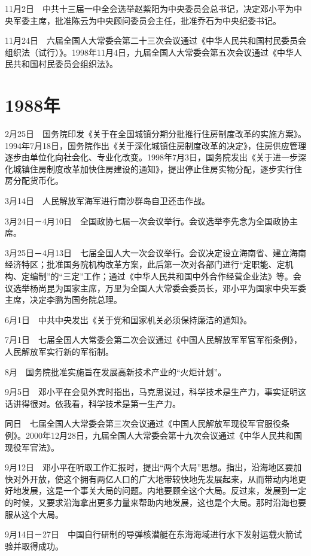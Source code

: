 \documentclass[10pt,a4paper,twocolumn]{book}
\begin{document}
11月2日　中共十三届一中全会选举赵紫阳为中央委员会总书记，决定邓小平为中央军委主席，批准陈云为中央顾问委员会主任，批准乔石为中央纪委书记。

11月24日　六届全国人大常委会第二十三次会议通过《中华人民共和国村民委员会组织法（试行）》。1998年11月4日，九届全国人大常委会第五次会议通过《中华人民共和国村民委员会组织法》。

\section{1988年}

2月25日　国务院印发《关于在全国城镇分期分批推行住房制度改革的实施方案》。1994年7月18日，国务院作出《关于深化城镇住房制度改革的决定》，住房供应管理逐步由单位化向社会化、专业化改变。1998年7月3日，国务院发出《关于进一步深化城镇住房制度改革加快住房建设的通知》，提出停止住房实物分配，逐步实行住房分配货币化。

3月14日　人民解放军海军进行南沙群岛自卫还击作战。

3月24日－4月10日　全国政协七届一次会议举行。会议选举李先念为全国政协主席。

3月25日－4月13日　七届全国人大一次会议举行。会议决定设立海南省、建立海南经济特区；批准国务院机构改革方案，此后第一次对各部门进行“定职能、定机构、定编制”的“三定”工作；通过《中华人民共和国中外合作经营企业法》等。会议选举杨尚昆为国家主席，万里为全国人大常委会委员长，邓小平为国家中央军委主席，决定李鹏为国务院总理。

6月1日　中共中央发出《关于党和国家机关必须保持廉洁的通知》。

7月1日　七届全国人大常委会第二次会议通过《中国人民解放军军官军衔条例》，人民解放军实行新的军衔制。

8月　国务院批准实施旨在发展高新技术产业的“火炬计划”。

9月5日　邓小平在会见外宾时指出，马克思说过，科学技术是生产力，事实证明这话讲得很对。依我看，科学技术是第一生产力。

同日　七届全国人大常委会第三次会议通过《中国人民解放军现役军官服役条例》。2000年12月28日，九届全国人大常委会第十九次会议通过《中华人民共和国现役军官法》。

9月12日　邓小平在听取工作汇报时，提出“两个大局”思想。指出，沿海地区要加快对外开放，使这个拥有两亿人口的广大地带较快地先发展起来，从而带动内地更好地发展，这是一个事关大局的问题。内地要顾全这个大局。反过来，发展到一定的时候，又要求沿海拿出更多力量来帮助内地发展，这也是个大局。那时沿海也要服从这个大局。

9月14日－27日　中国自行研制的导弹核潜艇在东海海域进行水下发射运载火箭试验并取得成功。
\end{document}
